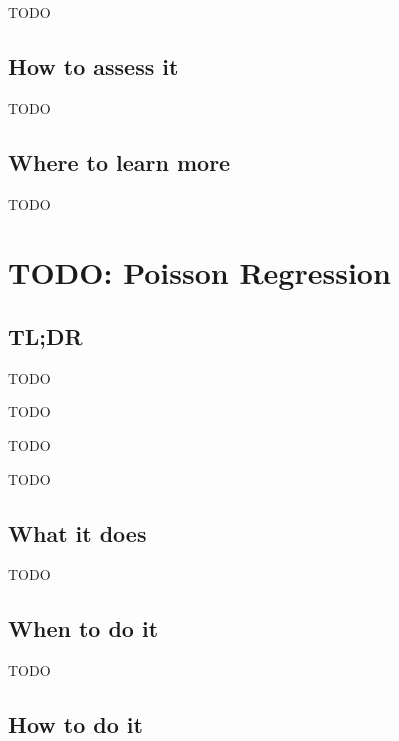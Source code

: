 \documentclass[
]{book}
\providecommand{\tightlist}{%
  \setlength{\itemsep}{0pt}\setlength{\parskip}{0pt}}
\begin{document}
TODO

\hypertarget{how-to-assess-it-6}{%
\section{How to assess it}\label{how-to-assess-it-6}}

TODO

\hypertarget{where-to-learn-more-6}{%
\section{Where to learn more}\label{where-to-learn-more-6}}

TODO

\hypertarget{poisson-regression}{%
\chapter{TODO: Poisson Regression}\label{poisson-regression}}

\hypertarget{tldr-7}{%
\section{TL;DR}\label{tldr-7}}

\begin{description}
\tightlist
\item[What it does]
TODO
\item[When to do it]
TODO
\item[How to do it]
TODO
\item[How to assess it]
TODO
\end{description}

\hypertarget{what-it-does-7}{%
\section{What it does}\label{what-it-does-7}}

TODO

\hypertarget{when-to-do-it-7}{%
\section{When to do it}\label{when-to-do-it-7}}

TODO

\hypertarget{how-to-do-it-7}{%
\section{How to do it}\label{how-to-do-it-7}}
\end{document}
